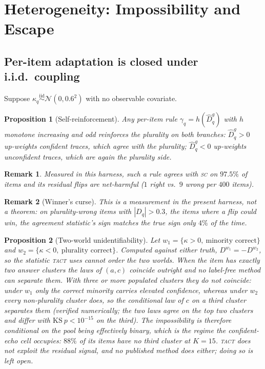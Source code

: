 \documentclass[conference]{IEEEtran}
\newtheorem{proposition}{Proposition}
\newtheorem{remark}{Remark}
\newcommand{\Dhat}{\widehat{D}}
\newcommand{\SC}{\textsc{sc}}
\newcommand{\TACT}{\textsc{tact}}
\begin{document}
\section{Heterogeneity: Impossibility and Escape}\label{sec:hetero}

\subsection{Per-item adaptation is closed under i.i.d.\ coupling}
Suppose $\kappa_q\stackrel{\text{iid}}{\sim}\mathcal{N}(0,0.6^2)$ with no observable covariate.

\begin{proposition}[Self-reinforcement]\label{prop:selfreinf}
Any per-item rule $\gamma_q=h(\Dhat^g_q)$ with $h$ monotone increasing and odd reinforces the plurality on both branches: $\Dhat^g_q>0$ up-weights confident traces, which agree with the plurality; $\Dhat^g_q<0$ up-weights unconfident traces, which are again the plurality side.
\end{proposition}
\begin{remark}
Measured in this harness, such a rule agrees with \SC{} on $97.5\%$ of items and its residual flips are net-harmful ($1$ right vs.\ $9$ wrong per $400$ items).
\end{remark}

\begin{remark}[Winner's curse]\label{prop:curse}
This is a measurement in the present harness, not a theorem: on plurality-wrong items with $|D_q|>0.3$, the items where a flip could win, the agreement statistic's sign matches the true sign only $4\%$ of the time.
\end{remark}

\begin{proposition}[Two-world unidentifiability]\label{prop:twoworld}
Let $w_1=\{\kappa>0,\ \text{minority correct}\}$ and
$w_2=\{\kappa<0,\ \text{plurality correct}\}$. Computed against either truth,
$D^{w_1}=-D^{w_2}$, so the statistic \TACT{} uses cannot order the two worlds.
When the item has exactly two answer clusters the laws of $(a,c)$ coincide
outright and no label-free method can separate them. With three or more
\emph{populated} clusters they do not coincide: under $w_1$ only the correct
minority carries elevated confidence, whereas under $w_2$ every non-plurality
cluster does, so the conditional law of $c$ on a third cluster separates them
(verified numerically; the two laws agree on the top two clusters and differ
with $\mathrm{KS}\ p<10^{-15}$ on the third). The impossibility is therefore
conditional on the pool being effectively binary, which is the regime the
confident-echo cell occupies: $88\%$ of its items have no third cluster at
$K{=}15$. \TACT{} does not exploit the residual signal, and no published
method does either; doing so is left open.
\end{proposition}
\end{document}
